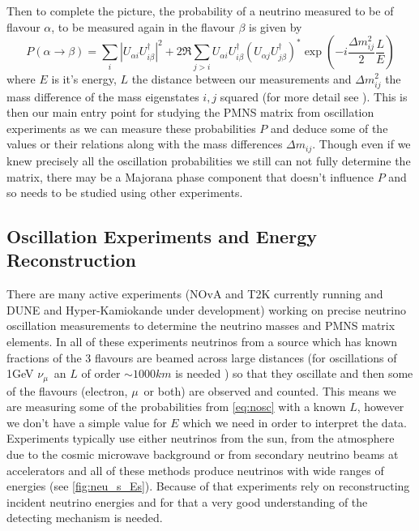 \documentclass[a4paper,12pt]{article}
\newcommand{\Mu}{$\mu$}
\newcommand{\Nm}{$\nu_\mu$}
\begin{document}
Then to complete the picture, the probability of a neutrino measured to be of flavour $\alpha$, to be measured again in the flavour $\beta$ is given by 
\begin{equation} \label{eq:nosc}
    P(\alpha \rightarrow \beta) = \sum_i |U_{\alpha i} U^\dag_{i \beta}|^2 + 2\Re \sum_{j>i} U_{\alpha i} U^\dag_{i \beta} (U_{\alpha j} U^\dag_{j \beta})^* \exp(-i\frac{\Delta m^2_{ij}}{2}\frac{L}{E})
\end{equation}
where $E$ is it's energy, $L$ the distance between our measurements and $\Delta m^2_{ij}$ the mass difference of the mass eigenstates $i, j$ squared (for more detail see \cite{zuberNeutrinoPhysics2020}).
This is then our main entry point for studying the PMNS matrix from oscillation experiments as we can measure these probabilities $P$ and deduce some of the values or their relations along with the mass differences $\Delta m_{ij}$.
Though even if we  knew precisely all the oscillation probabilities we still can not fully determine the matrix, there may be a Majorana phase component that doesn't influence $P$ and so needs to be studied using other experiments.

\subsection{Oscillation Experiments and Energy Reconstruction}\label{sec:exanderec}
There are many active experiments (NOvA and T2K currently running and DUNE and Hyper-Kamiokande under development) working on precise neutrino oscillation measurements to determine the neutrino masses and PMNS matrix elements.
In all of these experiments neutrinos from a source which has known fractions of the 3 flavours are beamed across large distances (for oscillations of 1\si{GeV} \Nm\ an $L$ of order $\sim 1000\si{km}$ is needed \cite{mezzettoThreeFlavorOscillationsAccelerator2020}) so that they oscillate and then some of the flavours (electron, \Mu\ or both) are observed and counted.
This means we are measuring some of the probabilities from \cref{eq:nosc} with a known $L$, however we don't have a simple value for $E$ which we need in order to interpret the data.
Experiments typically use either neutrinos from the sun, from the atmosphere due to the cosmic microwave background or from secondary neutrino beams at accelerators and all of these methods produce neutrinos with wide ranges of energies (see \cref{fig:neu_s_Es}).
Because of that experiments rely on reconstructing incident neutrino energies and for that a very good understanding of the detecting mechanism is needed.
\end{document}
